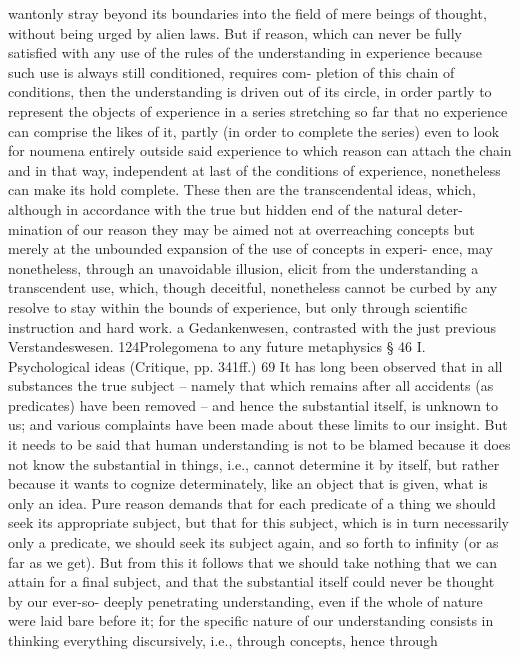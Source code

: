 wantonly stray beyond its boundaries into the ﬁeld of mere beings of
thought, without being urged by alien laws. But if reason, which can
never be fully satisﬁed with any use of the rules of the understanding in
experience because such use is always still conditioned, requires com-
pletion of this chain of conditions, then the understanding is driven out
of its circle, in order partly to represent the objects of experience in a
series stretching so far that no experience can comprise the likes of it,
partly (in order to complete the series) even to look for noumena entirely
outside said experience to which reason can attach the chain and in that
way, independent at last of the conditions of experience, nonetheless can
make its hold complete. These then are the transcendental ideas, which,
although in accordance with the true but hidden end of the natural deter-
mination of our reason they may be aimed not at overreaching concepts
but merely at the unbounded expansion of the use of concepts in experi-
ence, may nonetheless, through an unavoidable illusion, elicit from the
understanding a transcendent use, which, though deceitful, nonetheless
cannot be curbed by any resolve to stay within the bounds of experience,
but only through scientiﬁc instruction and hard work.
a
Gedankenwesen, contrasted with the just previous Verstandeswesen.
124Prolegomena to any future metaphysics
§ 46
I. Psychological ideas (Critique, pp. 341ff.) 69
It has long been observed that in all substances the true subject – namely
that which remains after all accidents (as predicates) have been removed –
and hence the substantial itself, is unknown to us; and various complaints
have been made about these limits to our insight. But it needs to be said
that human understanding is not to be blamed because it does not know
the substantial in things, i.e., cannot determine it by itself, but rather
because it wants to cognize determinately, like an object that is given,
what is only an idea. Pure reason demands that for each predicate of a
thing we should seek its appropriate subject, but that for this subject,
which is in turn necessarily only a predicate, we should seek its subject
again, and so forth to inﬁnity (or as far as we get). But from this it
follows that we should take nothing that we can attain for a ﬁnal subject,
and that the substantial itself could never be thought by our ever-so-
deeply penetrating understanding, even if the whole of nature were laid
bare before it; for the speciﬁc nature of our understanding consists in
thinking everything discursively, i.e., through concepts, hence through
